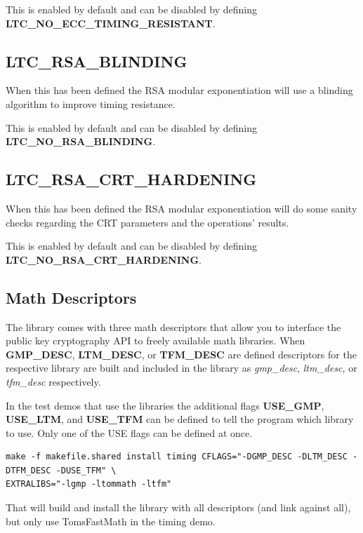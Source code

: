 \documentclass[synpaper]{book}
\begin{document}
This is enabled by default and can be disabled by defining \textbf{LTC\_NO\_ECC\_TIMING\_RESISTANT}.

\subsection{LTC\_RSA\_BLINDING}
When this has been defined the RSA modular exponentiation will use a blinding algorithm to improve timing resistance.

This is enabled by default and can be disabled by defining \textbf{LTC\_NO\_RSA\_BLINDING}.

\subsection{LTC\_RSA\_CRT\_HARDENING}
When this has been defined the RSA modular exponentiation will do some sanity checks regarding the CRT parameters and the operations' results.

This is enabled by default and can be disabled by defining \textbf{LTC\_NO\_RSA\_CRT\_HARDENING}.

\subsection{Math Descriptors}
 
\label{mp-init}
The library comes with three math descriptors that allow you to interface the public key cryptography API to freely available math
libraries.  When \textbf{GMP\_DESC}, \textbf{LTM\_DESC}, or \textbf{TFM\_DESC} are defined
descriptors for the respective library are built and included in the library as \textit{gmp\_desc}, \textit{ltm\_desc}, or \textit{tfm\_desc} respectively.

In the test demos that use the libraries the additional flags \textbf{USE\_GMP}, \textbf{USE\_LTM}, and \textbf{USE\_TFM} can be defined
to tell the program which library to use.  Only one of the USE flags can be defined at once.

     
\begin{small}
\begin{verbatim}
make -f makefile.shared install timing CFLAGS="-DGMP_DESC -DLTM_DESC -DTFM_DESC -DUSE_TFM" \
EXTRALIBS="-lgmp -ltommath -ltfm"
\end{verbatim}
\end{small}

That will build and install the library with all descriptors (and link against all), but only use TomsFastMath in the timing demo.
\end{document}
